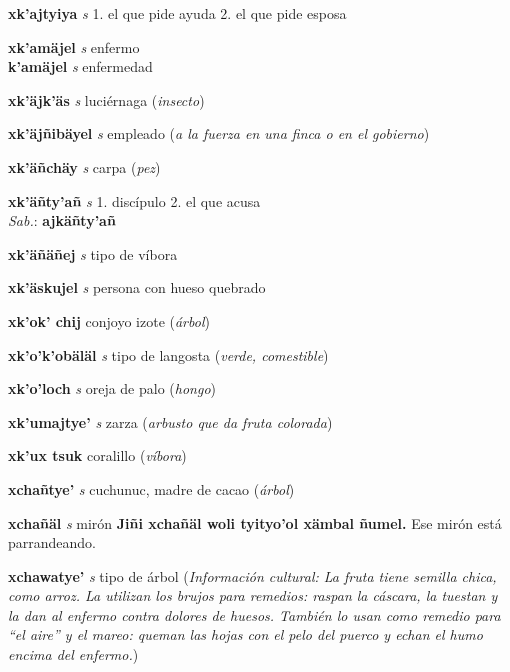 \documentclass[10pt]{scrbook}
\newcommand{\entry}[1]{\textbf{#1}}
\newcommand{\onedefinition}[1]{#1.}
\newcommand{\partofspeech}[1]{\textit{#1}}
\newcommand{\spanishtranslation}[1]{#1}
\newcommand{\clarification}[1]{(\textit{#1})}
\newcommand{\cholexample}[1]{\textbf{#1}}
\newcommand{\exampletranslation}[1]{#1}
\newcommand{\dialectvariant}[1]{\\\textit{#1}:}
\newcommand{\dialectword}[1]{\textbf{#1}}
\newcommand{\culturalinformation}[1]{(\textit{#1})}
\newcommand{\secondaryentry}[1]{\\\textbf{#1}}
\newcommand{\secondpartofspeech}[1]{\textit{#1}}
\newcommand{\secondtranslation}[1]{#1}
\begin{document}
\begin{multicols}{2}
\entry{xk'ajtyiya}
\partofspeech{s}
\onedefinition{1}
\spanishtranslation{el que pide ayuda}
\onedefinition{2}
\spanishtranslation{el que pide esposa}

\entry{xk'amäjel}
\partofspeech{s}
\spanishtranslation{enfermo}
\secondaryentry{k'amäjel}
\secondpartofspeech{s}
\secondtranslation{enfermedad}

\entry{xk'äjk'äs}
\partofspeech{s}
\spanishtranslation{luciérnaga}
\clarification{insecto}

\entry{xk'äjñibäyel}
\partofspeech{s}
\spanishtranslation{empleado}
\clarification{a la fuerza en una finca o en el gobierno}

\entry{xk'äñchäy}
\partofspeech{s}
\spanishtranslation{carpa}
\clarification{pez}

\entry{xk'äñty'añ}
\partofspeech{s}
\onedefinition{1}
\spanishtranslation{discípulo}
\onedefinition{2}
\spanishtranslation{el que acusa}
\dialectvariant{Sab.}
\dialectword{ajkäñty'añ}

\entry{xk'äñäñej}
\partofspeech{s}
\spanishtranslation{tipo de víbora}

\entry{xk'äskujel}
\partofspeech{s}
\spanishtranslation{persona con hueso quebrado}

\entry{xk'ok' chij}
\spanishtranslation{conjoyo}
\spanishtranslation{izote}
\clarification{árbol}

\entry{xk'o'k'obäläl}
\partofspeech{s}
\spanishtranslation{tipo de langosta}
\clarification{verde, comestible}

\entry{xk'o'loch}
\partofspeech{s}
\spanishtranslation{oreja de palo}
\clarification{hongo}

\entry{xk'umajtye'}
\partofspeech{s}
\spanishtranslation{zarza}
\clarification{arbusto que da fruta colorada}

\entry{xk'ux tsuk}
\spanishtranslation{coralillo}
\clarification{víbora}

\entry{xchañtye'}
\partofspeech{s}
\spanishtranslation{cuchunuc, madre de cacao}
\clarification{árbol}

\entry{xchañäl}
\partofspeech{s}
\spanishtranslation{mirón}
\cholexample{Jiñi xchañäl woli tyityo'ol xämbal ñumel.}
\exampletranslation{Ese mirón está parrandeando.}

\entry{xchawatye'}
\partofspeech{s}
\spanishtranslation{tipo de árbol}
\culturalinformation{Información cultural: La fruta tiene semilla chica, como arroz. La utilizan los brujos para remedios: raspan la cáscara, la tuestan y la dan al enfermo contra dolores de huesos. También lo usan como remedio para “el aire” y el mareo: queman las hojas con el pelo del puerco y echan el humo encima del enfermo.}


\end{multicols}
\end{document}
